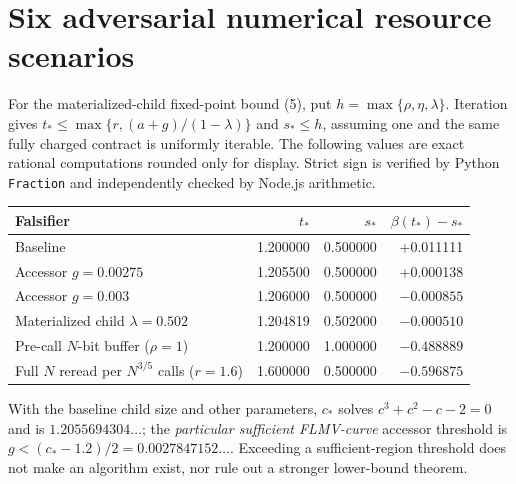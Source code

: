 \documentclass[11pt]{article}
\begin{document}
\section{Six adversarial numerical resource scenarios}
For the materialized-child fixed-point bound (5), put $h=\max\{\rho,\eta,\lambda\}$. Iteration gives $t_*\le\max\{r,(a+g)/(1-\lambda)\}$ and $s_*\le h$, assuming one and the same fully charged contract is uniformly iterable. The following values are exact rational computations rounded only for display. Strict sign is verified by Python \texttt{Fraction} and independently checked by Node.js arithmetic.
\begin{center}
\begin{tabular}{lrrr}
\toprule
Falsifier & $t_*$ & $s_*$ & $\beta(t_*)-s_*$\\\midrule
Baseline &1.200000&0.500000&+0.011111\\
Accessor $g=0.00275$&1.205500&0.500000&+0.000138\\
Accessor $g=0.003$&1.206000&0.500000&$-0.000855$\\
Materialized child $\lambda=0.502$&1.204819&0.502000&$-0.000510$\\
Pre-call $N$-bit buffer ($\rho=1$)&1.200000&1.000000&$-0.488889$\\
Full $N$ reread per $N^{3/5}$ calls ($r=1.6$)&1.600000&0.500000&$-0.596875$\\
\bottomrule
\end{tabular}
\end{center}
With the baseline child size and other parameters, $c_*$ solves $c^3+c^2-c-2=0$ and is $1.2055694304\ldots$; the \emph{particular sufficient FLMV-curve} accessor threshold is $g<(c_*-1.2)/2=0.0027847152\ldots$. Exceeding a sufficient-region threshold does not make an algorithm exist, nor rule out a stronger lower-bound theorem.
\end{document}
